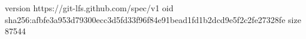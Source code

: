 version https://git-lfs.github.com/spec/v1
oid sha256:afbfe3a953d79300ecc3d5fd33f96f84e91bead1fd1b2dcd9e5f2c2fe27328fe
size 87544
